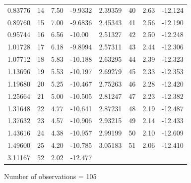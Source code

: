 \documentclass[11pt]{article}
\begin{document}
\begin{appendices}
\begin{table}[H]
\begin{small}
\begin{center}
\begin{tabular}{|p{15mm} p{15mm} p{15mm} p{15mm} || p{15mm} p{15mm}p{15mm} p{15mm}|}
		 0.83776     & 14    &        7.50     &    -9.9332 &  2.39359    &  40    &        2.63    &     -12.124\\ 
		 0.89760     & 15    &        7.00     &    -9.6836 &  2.45343    &  41    &        2.56    &     -12.190\\ 
		 0.95744     & 16    &        6.56     &    -10.00  & 2.51327    &  42           & 2.50    &     -12.248\\ 
		 1.01728     & 17    &        6.18     &    -9.8994 & 2.57311    &  43      &      2.44    &     -12.306\\ 
		 1.07712     & 18    &        5.83     &    -10.188 & 2.63295    &  44      &      2.39    &     -12.323\\ 
		 1.13696     & 19    &        5.53     &    -10.197 & 2.69279    &  45      &      2.33    &     -12.353\\ 
		 1.19680     & 20    &        5.25     &    -10.467 &  2.75263    &  46      &      2.28    &     -12.420\\ 
		 1.25664     & 21    &        5.00     &    -10.505 &  2.81247    &  47      &      2.23    &     -12.382\\ 
		 1.31648     & 22    &        4.77    &    -10.641 &  2.87231    &  48      &      2.19    &     -12.487\\ 
		 1.37632     & 23    &        4.57     &    -10.906 &  2.93215    &  49      &    2.14      &   -12.433\\ 
		 1.43616     & 24    &        4.38     &    -10.957 &  2.99199    &  50        &    2.10    &     -12.609\\ 
		 1.49600      &25    &        4.20     &    -10.785 &   3.05183    &  51      &      2.06    &     -12.410\\ 
		 3.11167    &  52      &      2.02    &     -12.477 & & & & \\   \hline \hline
	\end{tabular}
	\end{center}
	\end{small}
	Number of observations = 105
\end{table}


\end{appendices}
\end{document}
